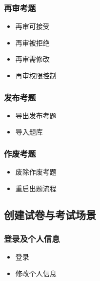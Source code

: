 \documentclass[hyperref, a4paper]{ctexart}
\providecommand{\tightlist}{%
  \setlength{\itemsep}{0pt}\setlength{\parskip}{0pt}}
\begin{document}
\hypertarget{ux518dux5ba1ux8003ux9898-1}{%
\subsubsection{再审考题}\label{ux518dux5ba1ux8003ux9898-1}}

\begin{itemize}
\tightlist
\item
  再审可接受
\item
  再审被拒绝
\item
  再审需修改
\item
  再审权限控制
\end{itemize}

\hypertarget{ux53d1ux5e03ux8003ux9898-1}{%
\subsubsection{发布考题}\label{ux53d1ux5e03ux8003ux9898-1}}

\begin{itemize}
\tightlist
\item
  导出发布考题
\item
  导入题库
\end{itemize}

\hypertarget{ux4f5cux5e9fux8003ux9898-1}{%
\subsubsection{作废考题}\label{ux4f5cux5e9fux8003ux9898-1}}

\begin{itemize}
\tightlist
\item
  废除作废考题
\item
  重启出题流程
\end{itemize}

\hypertarget{ux521bux5efaux8bd5ux5377ux4e0eux8003ux8bd5ux573aux666f}{%
\subsection{创建试卷与考试场景}\label{ux521bux5efaux8bd5ux5377ux4e0eux8003ux8bd5ux573aux666f}}

\hypertarget{ux767bux5f55ux53caux4e2aux4ebaux4fe1ux606f-1}{%
\subsubsection{登录及个人信息}\label{ux767bux5f55ux53caux4e2aux4ebaux4fe1ux606f-1}}

\begin{itemize}
\tightlist
\item
  登录
\item
  修改个人信息
\end{itemize}
\end{document}
